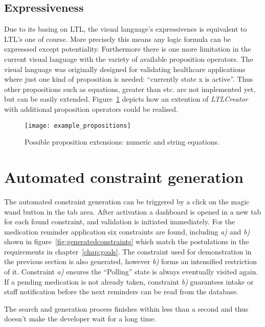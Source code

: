 \subsection{Expressiveness}

Due to its basing on LTL, the visual language's expressivenes is equivalent to LTL's one of course. More precisely this means any logic formula can be expresssed except potentiality.
Furthermore there is one more limitation in the current visual language with the variety of available proposition operators. The visual language was originally designed for validating healthcare applications where just one kind of proposition is needed: ``currently state x is active''. Thus other propositions such as equations, greater than etc. are not implemented yet, but can be easily extended.
Figure~\ref{fig:example_propositions} depicts how an extention of \emph{LTLCreator} with additional proposition operators could be realised.

\begin{figure}[htbp]
  \centering
  \texttt{[image: example\_propositions]}
  \caption{Possible proposition extensions: numeric and string equations.}
  \label{fig:example_propositions}
\end{figure}



\section{Automated constraint generation}

The automated constraint generation can be triggered by a click on the magic wand button in the tab area. After activation a dashboard is opened in a new tab for each found constraint, and validation is initiated immediately. For the medication reminder application six constraints are found, including \emph{a)} and \emph{b)} shown in figure~\ref{fig:generatedconstraints} which match the postulations in the requirements in chapter~\ref{chap:goals}.
The constraint used for demonstration in the previous section is also generated, however \emph{b)} forms an intensified restriction of it. 
Constraint \emph{a)} ensures the ``Polling'' state is always eventually visited again. If a pending medication is not already taken, constraint \emph{b)} guarantees intake or staff notification before the next reminders can be read from the database.

The search and generation process finishes within less than a second and thus doesn't make the developer wait for a long time.

